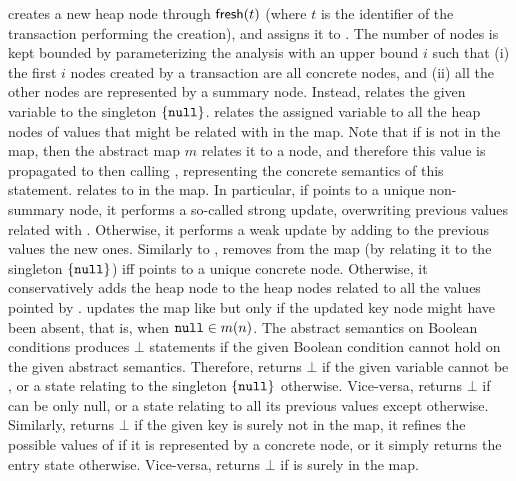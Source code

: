  creates a new heap node through $\mathsf{fresh}(t)$ (where $t$ is the identifier of the transaction performing the creation), and assigns it to . The number of nodes is kept bounded by parameterizing the analysis with an upper bound $i$ such that (i) the first $i$ nodes created by a transaction are all concrete nodes, and (ii) all the other nodes are represented by a summary node. Instead,  relates the given variable to the singleton $\{\mathtt{null}\}$.
%
 relates the assigned variable  to all the heap nodes of values that might be related with  in the map. Note that if  is not in the map, then the abstract map $m$ relates it to a  node, and therefore this value is propagated to  then calling , representing the concrete semantics of this statement.
%
 relates  to  in the map. In particular, if  points to a unique non-summary node, it performs a so-called strong update, overwriting previous values related with . Otherwise, it performs a weak update by adding to the previous values the new ones.  Similarly to ,  removes  from the map (by relating it to the singleton $\{\mathtt{null}\}$) iff  points to a unique concrete node. Otherwise, it conservatively adds the heap node  to the heap nodes related to all the values pointed by .  updates the map like  but only if the updated key node might have been absent, that is, when $\mathtt{null} \in m(n)$. 
The abstract semantics on Boolean conditions produces $\bot$ statements if the given Boolean condition cannot hold on the given abstract semantics. Therefore,  returns $\bot$ if the given variable  cannot be , or a state relating  to the singleton $\{\mathtt{null}\}$ otherwise. Vice-versa,  returns $\bot$ if  can be only null, or a state relating  to all its previous values except  otherwise.
Similarly,  returns $\bot$ if the given key  is surely not in the map, it refines the possible values of  if it is represented by a concrete node, or it simply returns the entry state otherwise. Vice-versa,  returns $\bot$ if  is surely in the map.


